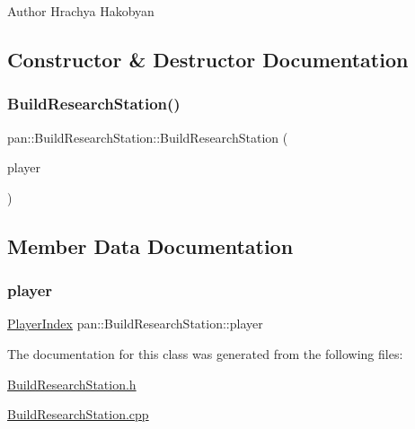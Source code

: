 \begin{DoxyAuthor}{Author}
Hrachya Hakobyan 
\end{DoxyAuthor}


\subsection{Constructor \& Destructor Documentation}
\mbox{\label{classpan_1_1_build_research_station_a3cd2f5cb3c914c9afa042cd762f46028}} 
\subsubsection{\texorpdfstring{Build\+Research\+Station()}{BuildResearchStation()}}
{\footnotesize\ttfamily pan\+::\+Build\+Research\+Station\+::\+Build\+Research\+Station (\begin{DoxyParamCaption}\item[{\hyperlink{namespacepan_a0cdabf874fbf1bb3a1f0152d108c2909}{Player\+Index}}]{player }\end{DoxyParamCaption})}



\subsection{Member Data Documentation}
\mbox{\label{classpan_1_1_build_research_station_aa3d64958ccabccec40f25efa85b078a5}} 
\subsubsection{\texorpdfstring{player}{player}}
{\footnotesize\ttfamily \hyperlink{namespacepan_a0cdabf874fbf1bb3a1f0152d108c2909}{Player\+Index} pan\+::\+Build\+Research\+Station\+::player}



The documentation for this class was generated from the following files\+:\begin{DoxyCompactItemize}
\item 
\hyperlink{_build_research_station_8h}{Build\+Research\+Station.\+h}\item 
\hyperlink{_build_research_station_8cpp}{Build\+Research\+Station.\+cpp}\end{DoxyCompactItemize}
